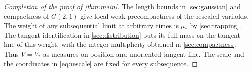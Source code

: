 \begin{proof}[Completion of the proof of \cref{thm:main}]
The length bounds in \cref{sec:gaussian} and compactness of \(G(2,1)\) give local weak precompactness of the rescaled varifolds. The weight of any subsequential limit at arbitrary times is \(\mu_*\) by \cref{sec:trapping}. The tangent identification in \cref{sec:distribution} puts its full mass on the tangent line of this weight, with the integer multiplicity obtained in \cref{sec:compactness}. Thus \(V=V_*\) as measures on position and unoriented tangent line. The scale and the coordinates in \eqref{eq:rescale} are fixed for every subsequence.
\end{proof}
